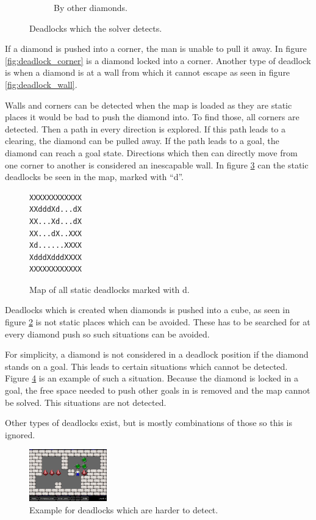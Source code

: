 \begin{figure}[h]
\begin{subfigure}{0.3\textwidth}
  \caption{By other diamonds.}
  \label{fig:deadlock_diamond}
\end{subfigure}
\caption{Deadlocks which the solver detects.}
\end{figure}

If a diamond is pushed into a corner, the man is unable to pull it away.
In figure \ref{fig:deadlock_corner} is a diamond locked into a corner.
Another type of deadlock is when a diamond is at a wall from which it cannot escape as seen in figure \ref{fig:deadlock_wall}.

Walls and corners can be detected when the map is loaded as they are static places it would be bad to push the diamond into.
To find those, all corners are detected.
Then a path in every direction is explored. 
If this path leads to a clearing, the diamond can be pulled away.
If the path leads to a goal, the diamond can reach a goal state.
Directions which then can directly move from one corner to another is considered an inescapable wall.
In figure \ref{fig:static_deadlocks} can the static deadlocks be seen in the map, marked with ``d''.

\begin{figure}[h]
 \centering
 \begin{minipage}{0.1\textwidth}
\begin{verbatim}
XXXXXXXXXXXX
XXdddXd...dX
XX...Xd...dX
XX...dX..XXX
Xd......XXXX
XdddXdddXXXX
XXXXXXXXXXXX
\end{verbatim}
 \end{minipage}
 \caption{Map of all static deadlocks marked with d.}
 \label{fig:static_deadlocks}
\end{figure}

Deadlocks which is created when diamonds is pushed into a cube, as seen in figure \ref{fig:deadlock_diamond} is not static places which can be avoided.
These has to be searched for at every diamond push so such situations can be avoided.

For simplicity, a diamond is not considered in a deadlock position if the diamond stands on a goal.
This leads to certain situations which cannot be detected.
Figure \ref{fig:deadlock_hard} is an example of such a situation.
Because the diamond is locked in a goal, the free space needed to push other goals in is removed and the map cannot be solved.
This situations are not detected.

Other types of deadlocks exist, but is mostly combinations of those so this is ignored.


\begin{figure}[h]
  \centering
  \includegraphics[width=0.3\textwidth]{img/deadlock_hard}
  \caption{Example for deadlocks which are harder to detect.}
  \label{fig:deadlock_hard}
\end{figure}


